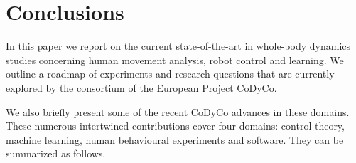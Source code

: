 \documentclass[final,5p,twocolumn]{elsarticle}
\begin{document}
%
%
%

\section{Conclusions}

In this paper we report on the current state-of-the-art in whole-body dynamics studies concerning human movement analysis, robot control and learning. We outline a roadmap of experiments  and  research  questions  that  are  currently  explored  by  the  consortium  of the European Project CoDyCo.

We also briefly present some of the recent CoDyCo advances in these domains. These numerous intertwined contributions cover four domains: control theory, machine learning, human behavioural experiments and software. They can be summarized as follows.
\end{document}
